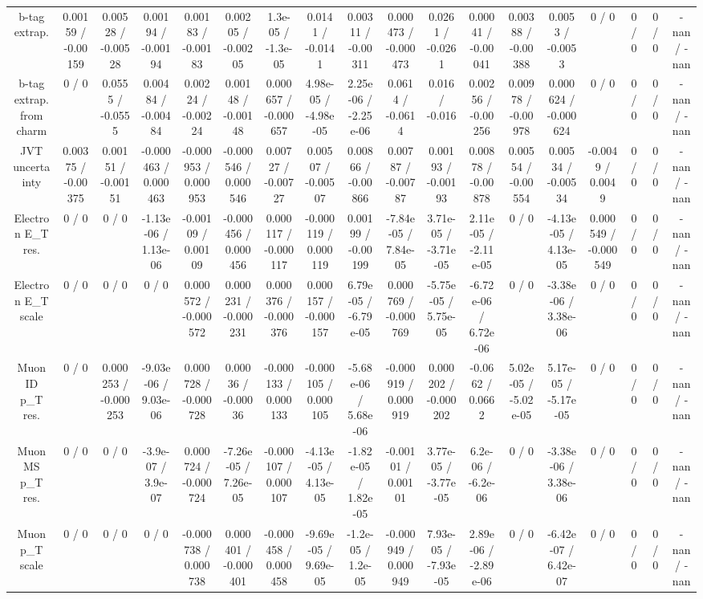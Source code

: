 \documentclass[10pt]{article}
\begin{document}
\begin{table}[htbp]
\begin{center}
\begin{tabular}{|c|c|c|c|c|c|c|c|c|c|c|c|c|c|c|c|c|c|}
  b-tag extrap. & 0.00159 / -0.00159 & 0.00528 / -0.00528 & 0.00194 / -0.00194 & 0.00183 / -0.00183 & 0.00205 / -0.00205 & 1.3e-05 / -1.3e-05 & 0.0141 / -0.0141 & 0.00311 / -0.00311 & 0.000473 / -0.000473 & 0.0261 / -0.0261 & 0.00041 / -0.00041 & 0.00388 / -0.00388 & 0.0053 / -0.0053 & 0 / 0 & 0 / 0 & 0 / 0 & -nan / -nan \\ 
  b-tag extrap. from charm & 0 / 0 & 0.0555 / -0.0555 & 0.00484 / -0.00484 & 0.00224 / -0.00224 & 0.00148 / -0.00148 & 0.000657 / -0.000657 & 4.98e-05 / -4.98e-05 & 2.25e-06 / -2.25e-06 & 0.0614 / -0.0614 & 0.016 / -0.016 & 0.00256 / -0.00256 & 0.00978 / -0.00978 & 0.000624 / -0.000624 & 0 / 0 & 0 / 0 & 0 / 0 & -nan / -nan \\ 
  JVT uncertainty & 0.00375 / -0.00375 & 0.00151 / -0.00151 & -0.000463 / 0.000463 & -0.000953 / 0.000953 & -0.000546 / 0.000546 & 0.00727 / -0.00727 & 0.00507 / -0.00507 & 0.00866 / -0.00866 & 0.00787 / -0.00787 & 0.00193 / -0.00193 & 0.00878 / -0.00878 & 0.00554 / -0.00554 & 0.00534 / -0.00534 & -0.0049 / 0.0049 & 0 / 0 & 0 / 0 & -nan / -nan \\ 
  Electron E_{T} res. & 0 / 0 & 0 / 0 & -1.13e-06 / 1.13e-06 & -0.00109 / 0.00109 & -0.000456 / 0.000456 & 0.000117 / -0.000117 & -0.000119 / 0.000119 & 0.00199 / -0.00199 & -7.84e-05 / 7.84e-05 & 3.71e-05 / -3.71e-05 & 2.11e-05 / -2.11e-05 & 0 / 0 & -4.13e-05 / 4.13e-05 & 0.000549 / -0.000549 & 0 / 0 & 0 / 0 & -nan / -nan \\ 
  Electron E_{T} scale & 0 / 0 & 0 / 0 & 0 / 0 & 0.000572 / -0.000572 & 0.000231 / -0.000231 & 0.000376 / -0.000376 & 0.000157 / -0.000157 & 6.79e-05 / -6.79e-05 & 0.000769 / -0.000769 & -5.75e-05 / 5.75e-05 & -6.72e-06 / 6.72e-06 & 0 / 0 & -3.38e-06 / 3.38e-06 & 0 / 0 & 0 / 0 & 0 / 0 & -nan / -nan \\ 
  Muon ID p_{T} res. & 0 / 0 & 0.000253 / -0.000253 & -9.03e-06 / 9.03e-06 & 0.000728 / -0.000728 & 0.00036 / -0.00036 & -0.000133 / 0.000133 & -0.000105 / 0.000105 & -5.68e-06 / 5.68e-06 & -0.000919 / 0.000919 & 0.000202 / -0.000202 & -0.0662 / 0.0662 & 5.02e-05 / -5.02e-05 & 5.17e-05 / -5.17e-05 & 0 / 0 & 0 / 0 & 0 / 0 & -nan / -nan \\ 
  Muon MS p_{T} res. & 0 / 0 & 0 / 0 & -3.9e-07 / 3.9e-07 & 0.000724 / -0.000724 & -7.26e-05 / 7.26e-05 & -0.000107 / 0.000107 & -4.13e-05 / 4.13e-05 & -1.82e-05 / 1.82e-05 & -0.00101 / 0.00101 & 3.77e-05 / -3.77e-05 & 6.2e-06 / -6.2e-06 & 0 / 0 & -3.38e-06 / 3.38e-06 & 0 / 0 & 0 / 0 & 0 / 0 & -nan / -nan \\ 
  Muon p_{T} scale & 0 / 0 & 0 / 0 & 0 / 0 & -0.000738 / 0.000738 & 0.000401 / -0.000401 & -0.000458 / 0.000458 & -9.69e-05 / 9.69e-05 & -1.2e-05 / 1.2e-05 & -0.000949 / 0.000949 & 7.93e-05 / -7.93e-05 & 2.89e-06 / -2.89e-06 & 0 / 0 & -6.42e-07 / 6.42e-07 & 0 / 0 & 0 / 0 & 0 / 0 & -nan / -nan \\ 

\end{tabular}
\end{center}
\end{table}
\end{document}
